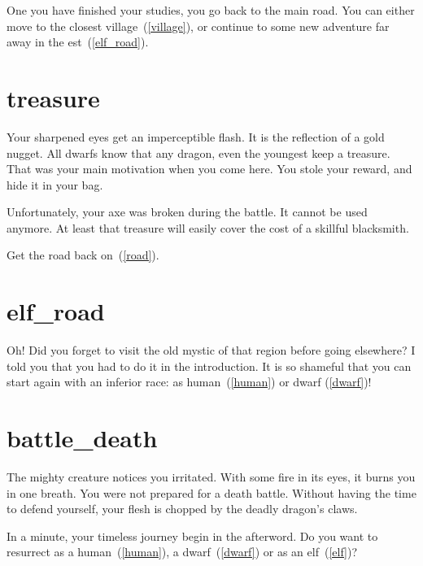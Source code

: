 One you have finished your studies, you go back to the main road. You can either
move to the closest village~(\ref{village}), or continue to some new adventure
far away in the est~(\ref{elf_road}).

\section{treasure}

Your sharpened eyes get an imperceptible flash. It is the reflection of a gold
nugget. All dwarfs know that any dragon, even the youngest keep a treasure. That
was your main motivation when you come here. You stole your reward, and hide it
in your bag.

Unfortunately, your axe was broken during the battle. It cannot be used anymore.
At least that treasure will easily cover the cost of a skillful blacksmith.

Get the road back on~(\ref{road}).


\section{elf_road}

Oh! Did you forget to visit the old mystic of that region before going
elsewhere? I told you that you had to do it in the introduction. It is so
shameful that you can start again with an inferior race: as human~(\ref{human})
or dwarf (\ref{dwarf})!

\section{battle_death}

The mighty creature notices you irritated. With some fire in its eyes, it burns
you in one breath. You were not prepared for a death battle. Without having the
time to defend yourself, your flesh is chopped by the deadly dragon's claws.

\medbreak

In a minute, your timeless journey begin in the afterword. Do you want to resurrect
as a human~(\ref{human}), a dwarf~(\ref{dwarf}) or as an elf~(\ref{elf})?
